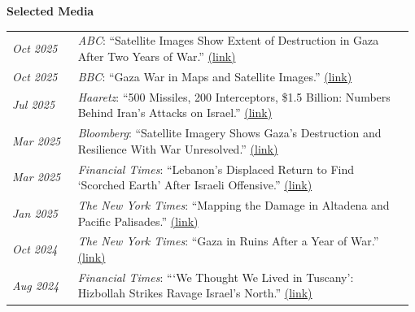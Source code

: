 \documentclass[letterpaper,11pt,oneside]{article}
\newcommand{\datefmt}[1]{\textit{#1}}
\begin{document}
\begin{flushleft}\textbf{Selected Media}\end{flushleft}
\vspace{-4ex}
\begin{longtable}{@{}p{0.16\linewidth}p{0.82\linewidth}@{}}

\datefmt{Oct 2025} & \textit{ABC}: “Satellite Images Show Extent of Destruction in Gaza After Two Years of War.” \href{https://abcnews.go.com/International/satellite-images-show-extent-destruction-gaza-after-2/story?id=126253670}{(link)}\\[1.0ex]

\datefmt{Oct 2025} & \textit{BBC}: “Gaza War in Maps and Satellite Images.” \href{https://www.bbc.com/news/resources/idt-217c6a28-4a90-4d47-a91c-13113a7dc7db}{(link)}\\[1.0ex]

\datefmt{Jul 2025} & \textit{Haaretz}: “500 Missiles, 200 Interceptors, \$1.5 Billion: Numbers Behind Iran’s Attacks on Israel.” \href{https://www.haaretz.com/israel-news/security-aviation/2025-07-01/ty-article/.premium/500-missiles-200-interceptors-5-billion-shekels-numbers-behind-irans-attacks-on-israel/00000197-c712-da1d-a5ff-e716a0680000}{(link)}\\[1.0ex]

\datefmt{Mar 2025} & \textit{Bloomberg}: “Satellite Imagery Shows Gaza’s Destruction and Resilience With War Unresolved.” \href{https://www.bloomberg.com/news/newsletters/2024-01-24/maplab-mapping-gaza-s-destruction}{(link)}\\[1.0ex]

\datefmt{Mar 2025} & \textit{Financial Times}: “Lebanon’s Displaced Return to Find ‘Scorched Earth’ After Israeli Offensive.” \href{https://www.ft.com/content/80d18e3b-8a7a-4f4d-8125-fed20790bb7d}{(link)}\\[1.0ex]

\datefmt{Jan 2025} & \textit{The New York Times}: “Mapping the Damage in Altadena and Pacific Palisades.” \href{https://www.nytimes.com/interactive/2025/01/09/us/la-wildfires-damage-photos-map.html}{(link)}\\[1.0ex]

\datefmt{Oct 2024} & \textit{The New York Times}: “Gaza in Ruins After a Year of War.” \href{https://www.nytimes.com/interactive/2024/10/07/world/middleeast/israel-gaza-destruction-hamas-war.html}{(link)}\\[1.0ex]

\datefmt{Aug 2024} & \textit{Financial Times}: “‘We Thought We Lived in Tuscany’: Hizbollah Strikes Ravage Israel’s North.” \href{https://www.ft.com/content/b78d2ec2-382b-4389-90d9-5ca6dcdb003b}{(link)}\\[1.0ex]


\end{longtable}
\end{document}

